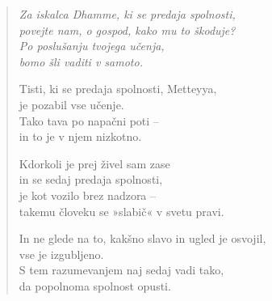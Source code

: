 \begin{verse}


\emph{Za iskalca Dhamme, ki se predaja spolnosti,\\
povejte nam, o gospod, kako mu to škoduje?\\
Po poslušanju tvojega učenja,\\
bomo šli vaditi v samoto.}

Tisti, ki se predaja spolnosti, Metteyya,\\
je pozabil vse učenje.\\
Tako tava po napačni poti --\\
in to je v njem nizkotno.

Kdorkoli je prej živel sam zase\\
in se sedaj predaja spolnosti,\\
je kot vozilo brez nadzora --\\
takemu človeku se »slabič« v svetu pravi.

In ne glede na to, kakšno slavo in ugled je osvojil,\\
vse je izgubljeno.\\
S tem razumevanjem naj sedaj vadi tako,\\
da popolnoma spolnost opusti.

\end{verse}


